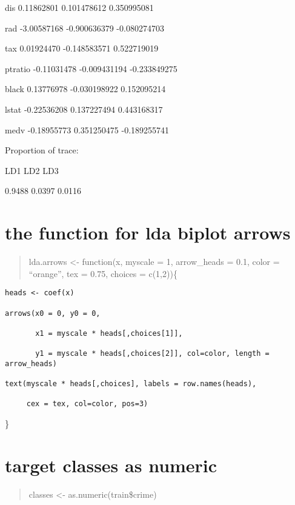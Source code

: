 \documentclass[]{article}
\begin{document}
dis 0.11862801 0.101478612 0.350995081

rad -3.00587168 -0.900636379 -0.080274703

tax 0.01924470 -0.148583571 0.522719019

ptratio -0.11031478 -0.009431194 -0.233849275

black 0.13776978 -0.030198922 0.152095214

lstat -0.22536208 0.137227494 0.443168317

medv -0.18955773 0.351250475 -0.189255741

Proportion of trace:

LD1 LD2 LD3

0.9488 0.0397 0.0116

\begin{quote}
\end{quote}

\section{the function for lda biplot
arrows}\label{the-function-for-lda-biplot-arrows}

\begin{quote}
lda.arrows \textless{}- function(x, myscale = 1, arrow\_heads = 0.1,
color = ``orange'', tex = 0.75, choices = c(1,2))\{
\end{quote}

\begin{verbatim}
heads <- coef(x) 

arrows(x0 = 0, y0 = 0,  

       x1 = myscale * heads[,choices[1]],  

       y1 = myscale * heads[,choices[2]], col=color, length = arrow_heads) 

text(myscale * heads[,choices], labels = row.names(heads),  

     cex = tex, col=color, pos=3) 
\end{verbatim}

\}

\begin{quote}
\end{quote}

\section{target classes as numeric}\label{target-classes-as-numeric}

\begin{quote}
classes \textless{}- as.numeric(train\$crime)
\end{quote}
\end{document}
